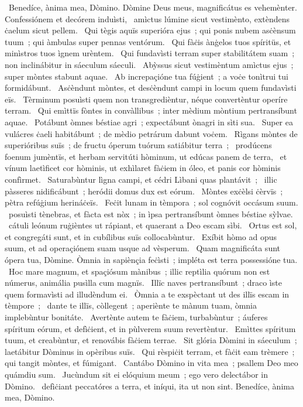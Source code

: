 ~Benedíce, ànima mea, Dòmino. Dòmine Deus meus, magnificátus es vehemènter. Confessiónem et decórem induìsti, 
~amìctus lúmine sicut vestimènto, extèndens ċaelum sicut pellem. 
~Qui tègis aquïs superióra ejus~; qui ponis nubem asċènsum tuum~; qui àmbulas super pennas ventórum. 
~Qui fàċis ànġelos tuos spíritüs, et minìstros tuos ìgnem urèntem. 
~Qui fundavìsti terram super stabilitátem suam~; non inclinábitur in sáeculum sáeculi. 
~Abỳssus sicut vestimèntum amìctus ejus~; super mòntes stabunt aquae. 
~Ab increpaçióne tua fúġient~; a voċe tonìtrui tui formidábunt. 
~Asċèndunt mòntes, et desċèndunt campi in locum quem fundavìsti eïs. 
~Tèrminum posuìsti quem non transgredièntur, néque convertèntur operíre terram. 
~Qui emìttïs fòntes in convàllibus~; inter mèdium mòntium pertransíbunt aquae. 
~Potábunt òmnes béstiae agri~; expectábunt ònagri in sìti sua. 
~Super ea vulácres ċaeli habitábunt~; de mèdio petrárum dabunt voċem. 
~Rìgans mòntes de superióribus suïs~; de fructu óperum tuórum satiábitur terra~; 
~prodúcens foenum jumèntïs, et herbam servitúti hòminum, ut edúcas panem de terra, 
~et vínum laetìficet cor hòminis, ut exhìlaret fàċiem in óleo, et panis cor hòminis confìrmet. 
~Saturabùntur lìgna campi, et cédri Lìbani quas plantávit~;
~illic pàsseres nidificábunt~; heródii domus dux est eórum. 
~Mòntes exċèlsi ċèrvïs~; pètra refúġium herináċeïs. 
~Feċit lunam in tèmpora~; sol cognóvit occásum suum. 
~posuìsti tènebras, et fàcta est nòx~; in ìpsa pertransíbunt òmnes béstiae sỳlvae. 
~cátuli leónum ruġièntes ut rápiant, et quaerant a Deo escam sìbi. 
~Ortus est sol, et congregáti sunt, et in cubílibus suïs collocabùntur. 
~Exíbit hòmo ad opus suum, et ad operaçiónem suam usque ad vèsperum. 
~Quam magnificáta sunt ópera tua, Dòmine. Òmnia in sapiènçia feċìsti~; impléta est terra possessióne tua. 
~Hoc mare magnum, et spaçiósum mànibus~; illic reptìlia quórum non est númerus, animália pusìlla cum magnïs. 
~Illïc naves pertransíbunt~; draco ìste quem formavìsti ad illudèndum ei. 
~Òmnia a te exspèctant ut des illïs escam in tèmpore~; 
~dante te illïs, còllegent~; aperiènte te mànum tuam, òmnia implebùntur bonitáte. 
~Avertènte autem te fàċiem, turbabùntur~; áuferes spíritum eórum, et defìċient, et in pùlverem suum revertèntur. 
~Emìttes spíritum tuum, et creabùntur, et renovábis fàċiem terrae. 
~Sit glória Dòmini in sáeculum~; laetábitur Dòminus in opèribus suïs. 
~Qui rèspiċit terram, et fàċit eam trèmere~; qui tangit mòntes, et fúmigant. 
~Cantábo Dòmino in vita mea~; psallem Deo meo quámdiu sum. 
~Jucùndum sit ei elóquium meum~; ego vero delectábor in Dòmino. 
~defìċiant peccatóres a terra, et iníqui, ita ut non sint. Benedíce, ànima mea, Dòmino. 
